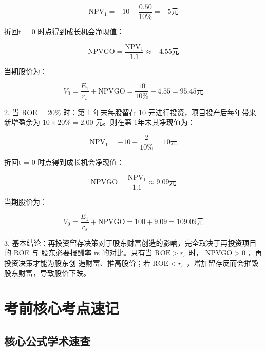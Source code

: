 \documentclass[lang=cn,10pt,color=blue]{elegantbook}
\begin{document}
$$
\mathrm{NPV} _ {1} = - 1 0 + \frac {0 . 5 0}{10 \%} = - 5 \text{元}
$$

折回t = 0 时点得到成长机会净现值： 

$$
\mathrm{NPVGO} = \frac {\mathrm{NPV} _ {1}}{1 . 1} \approx - 4. 5 5 \text {元}
$$

当期股价为： 

$$
V _ {0} = \frac {E _ {1}}{r _ {s}} + \mathrm{NPVGO} = \frac {1 0}{10 \%} - 4. 5 5 = 9 5. 4 5 \text{元}
$$

2. 当 ROE = 20\% 时：第 1 年末每股留存 10 元进行投资，项目投产后每年带来新增盈余为 $1 0 \times 2 0 \% = 2 . 0 0$ 元。则在第 1年末其净现值为： 

$$
\mathrm{NPV} _ {1} = - 1 0 + \frac {2}{10 \%} = 1 0 \text{元}
$$

折回t = 0 时点得到成长机会净现值： 

$$
\mathrm{NPVGO} = \frac {\mathrm{NPV} _ {1}}{1 . 1} \approx 9. 0 9 \text {元}
$$

当期股价为： 

$$
V _ {0} = \frac {E _ {1}}{r _ {s}} + \mathrm{NPVGO} = 1 0 0 + 9. 0 9 = 1 0 9. 0 9 \text {元}
$$

3. 基本结论：再投资留存决策对于股东财富创造的影响，完全取决于再投资项目的 ROE 与 股东必要报酬率 rs 的对比。只有当 $\mathrm { R O E } > r _ { s }$ 时， $\mathrm { N P V G O } > 0$ ，再投资决策才能为股东创 造财富、推高股价；若 $\mathrm { R O E } < r _ { s }$ ，增加留存反而会摧毁股东财富，导致股价下跌。 

\section{考前核心考点速记}

\subsection{核心公式学术速查}
\end{document}
